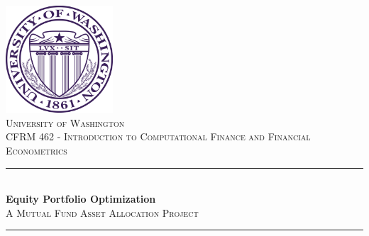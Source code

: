 \begin{titlepage}


\newcommand{\HRule}{\rule{\linewidth}{0.5mm}} %

\begin{center}



\includegraphics[height=4cm]{images/uw_seal}\\[1cm] %

\textsc{\LARGE University of Washington}
\\[0.5cm]
\textsc{\normalsize CFRM 462 - Introduction to Computational Finance and Financial Econometrics}\\[3cm]




\HRule \\[0.9cm]
{\huge \bfseries Equity Portfolio Optimization}\\[0.4cm] %
\textsc{\Large A Mutual Fund Asset Allocation Project}\\[0.5cm] %
\HRule \\[1.5cm]



\end{center}
\end{titlepage}
